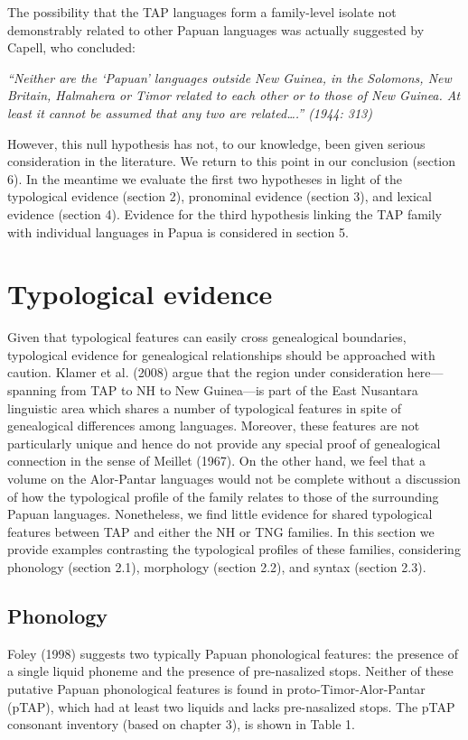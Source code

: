 The possibility that the TAP languages form a family-level isolate not demonstrably related to other Papuan languages was actually suggested by Capell, who concluded:

{\itshape
{\textquotedblleft}Neither are the {\textquoteleft}Papuan{\textquoteright} languages outside New Guinea, in the Solomons, New Britain, Halmahera or Timor related to each other or to those of New Guinea. At least it cannot be assumed that any two are related{\dots}.{\textquotedblright} \textup{(1944: 313)}}

However, this null hypothesis has not, to our knowledge, been given serious consideration in the literature. We return to this point in our conclusion (section 6). In the meantime we evaluate the first two hypotheses in light of the typological evidence (section 2), pronominal evidence (section 3), and lexical evidence (section 4). Evidence for the third hypothesis linking the TAP family with individual languages in Papua is considered in section 5.

\section[Typological evidence]{Typological evidence}
\hypertarget{RefHeading72064871885726}{}Given that typological features can easily cross genealogical boundaries, typological evidence for genealogical relationships should be approached with caution. Klamer et al. (2008) argue that the region under consideration here---spanning from TAP to NH to New Guinea---is part of the East Nusantara linguistic area which shares a number of typological features in spite of genealogical differences among languages. Moreover, these features are not particularly unique and hence do not provide any special proof of genealogical connection in the sense of Meillet (1967). On the other hand, we feel that a volume on the Alor-Pantar languages would not be complete without a discussion of how the typological profile of the family relates to those of the surrounding Papuan languages. Nonetheless, we find little evidence for shared typological features between TAP and either the NH or TNG families. In this section we provide examples contrasting the typological profiles of these 
families, considering phonology (section 2.1), morphology (section 2.2), and syntax (section 2.3).

\subsection[Phonology]{Phonology}
\hypertarget{RefHeading72066871885726}{}Foley (1998) suggests two typically Papuan phonological features: the presence of a single liquid phoneme and the presence of pre-nasalized stops. Neither of these putative Papuan phonological features is found in proto-Timor-Alor-Pantar (pTAP), which had at least two liquids and lacks pre-nasalized stops. The pTAP consonant inventory (based on chapter 3), is shown in Table 1.

